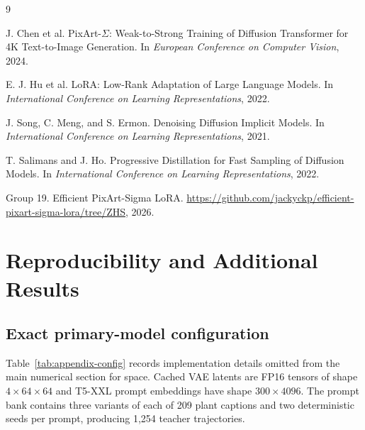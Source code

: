 \documentclass{article}
\begin{document}
\clearpage
\begin{thebibliography}{9}

J. Chen et al.
\newblock PixArt-$\Sigma$: Weak-to-Strong Training of Diffusion Transformer for 4K Text-to-Image Generation.
\newblock In \emph{European Conference on Computer Vision}, 2024.

E. J. Hu et al.
\newblock LoRA: Low-Rank Adaptation of Large Language Models.
\newblock In \emph{International Conference on Learning Representations}, 2022.

J. Song, C. Meng, and S. Ermon.
\newblock Denoising Diffusion Implicit Models.
\newblock In \emph{International Conference on Learning Representations}, 2021.

T. Salimans and J. Ho.
\newblock Progressive Distillation for Fast Sampling of Diffusion Models.
\newblock In \emph{International Conference on Learning Representations}, 2022.

Group 19.
\newblock Efficient PixArt-Sigma LoRA.
\newblock \url{https://github.com/jackyckp/efficient-pixart-sigma-lora/tree/ZHS}, 2026.

\end{thebibliography}


\clearpage
\appendix
\section{Reproducibility and Additional Results}
\label{app:repro}

\subsection{Exact primary-model configuration}
Table~\ref{tab:appendix-config} records implementation details omitted from the
main numerical section for space.  Cached VAE latents are FP16 tensors of shape
$4\times64\times64$ and T5-XXL prompt embeddings have shape $300\times4096$.
The prompt bank contains three variants of each of 209 plant captions and two
deterministic seeds per prompt, producing 1,254 teacher trajectories.
\end{document}

